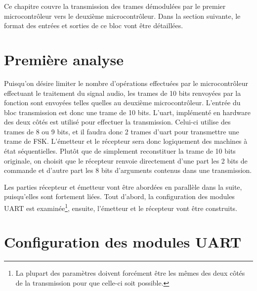 Ce chapitre couvre la transmission des trames démodulées par le premier microcontrôleur vers le deuxième microcontrôleur. Dans la section suivante, le format des entrées et sorties de ce bloc vont être détaillées.

\section{Première analyse}
Puisqu'on désire limiter le nombre d'opérations effectuées par le microcontrôleur effectuant le traitement du signal audio, les trames de 10 bits renvoyées par la fonction  sont envoyées telles quelles au deuxième microcontrôleur. L'entrée du bloc transmission est donc une trame de 10 bits. L'uart, implémenté en hardware des deux côtés est utilisé pour effectuer la transmission. Celui-ci utilise des trames de 8 ou 9 bits, et il faudra donc 2 trames d'uart pour transmettre une trame de FSK. L'émetteur et le récepteur sera donc logiquement des machines à état séquentielles. Plutôt que de simplement reconstituer la trame de 10 bits originale, on choisit que le récepteur renvoie directement d'une part les 2 bits de commande et d'autre part les 8 bits d'arguments contenus dans une transmission.

Les parties récepteur et émetteur vont être abordées en parallèle dans la suite, puisqu'elles sont fortement liées. Tout d'abord, la configuration des modules UART est examinée\footnote{La plupart des paramètres doivent forcément être les mêmes des deux côtés de la transmission pour que celle-ci soit possible.}, ensuite, l'émetteur et le récepteur vont être construits.

\section{Configuration des modules UART}

